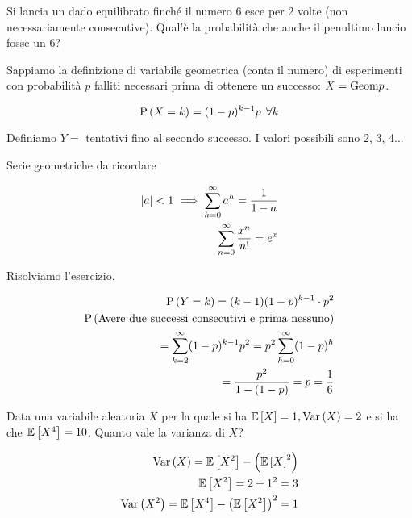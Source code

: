 \begin{exrc}
    Si lancia un dado equilibrato finché il numero 6 esce per 2 volte
    (non necessariamente consecutive). Qual'è la probabilità che anche il
    penultimo lancio fosse un 6?

    Sappiamo la definizione di variabile geometrica (conta il numero)
    di esperimenti con probabilità $ p $ falliti necessari prima di ottenere un
    successo: $ X = \text{Geom}{p} $.

    \begin{equation*}
        \text{P}\left(X = k\right) = (1-p)^{k-1}p \>\> \forall k
    \end{equation*}

    Definiamo $ Y = $ tentativi fino al secondo successo. I valori possibili sono 2, 3, 4...


    \begin{note}
        Serie geometriche da ricordare

        \begin{equation*}
            \begin{aligned}
                \lvert a\rvert < 1 \implies \sum_{h=0}^{\infty} a^h = \dfrac{1}{1-a} \\
                \sum_{n=0}^\infty \dfrac{x^n}{n!} = e^x
            \end{aligned}
        \end{equation*}
    \end{note}

    Risolviamo l'esercizio.

    \begin{equation*}
        \begin{aligned}
            \text{P}\left(Y = k\right) = (k-1)(1-p)^{k-1}\cdot p^2 \\
            \text{P}\left(\text{Avere due successi consecutivi e prima nessuno}\right) \\
            = \sum_{k=2}^\infty (1-p)^{k-1}p^2 =  p^2 \sum_{h=0}^{\infty} (1-p)^h \\
            = \dfrac{p^2}{1-(1-p)} = p = \dfrac{1}{6}
        \end{aligned}
    \end{equation*}
\end{exrc}


\begin{exrc}
    Data una variabile aleatoria $ X $ per la quale si ha $ \mathbb{E}\left[X\right] = 1, \text{Var}\left(X\right) = 2$ e si ha che $ \mathbb{E}\left[X^4\right] = 10 $. Quanto vale la varianza di $ X $?

    \begin{equation*}
        \begin{aligned}
            \text{Var}\left(X\right) = \mathbb{E}\left[X^2\right] - \left( \mathbb{E}\left[X\right]^2 \right) \\
            \mathbb{E}\left[X^2\right] = 2 + 1^2 = 3 \\
            \text{Var}\left(X^2\right) = \mathbb{E}\left[X^4\right] - \left( \mathbb{E}\left[X^2\right] \right)^2 = 1
        \end{aligned}
    \end{equation*}
\end{exrc}

